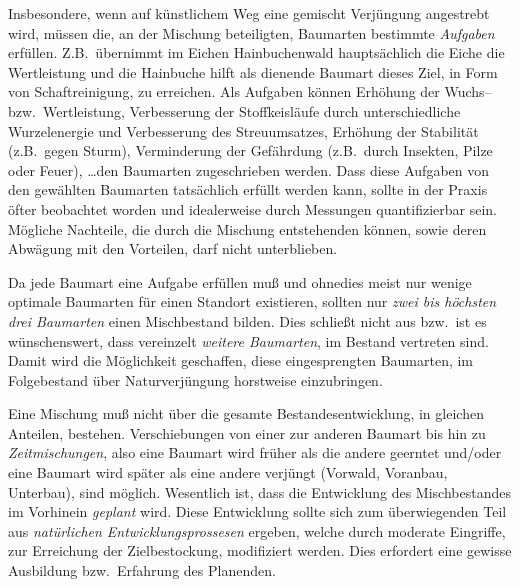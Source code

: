 \documentclass[twocolumn]{scrartcl}
\begin{document}
Insbesondere, wenn auf künstlichem Weg eine gemischt Verjüngung
angestrebt wird, müssen die, an der Mischung beteiligten, Baumarten
bestimmte \emph{Aufgaben} erfüllen. Z.B.\ übernimmt im Eichen
Hainbuchenwald hauptsächlich die Eiche die Wertleistung und die
Hainbuche hilft als dienende Baumart dieses Ziel, in Form von
Schaftreinigung, zu erreichen. Als Aufgaben können Erhöhung der
Wuchs-- bzw.\ Wertleistung, Verbesserung der Stoffkeisläufe durch
unterschiedliche Wurzelenergie und Verbesserung des Streuumsatzes,
Erhöhung der Stabilität (z.B.\ gegen Sturm), Verminderung der
Gefährdung (z.B.\ durch Insekten, Pilze oder Feuer), \dots den
Baumarten zugeschrieben werden. Dass diese Aufgaben von den gewählten
Baumarten tatsächlich erfüllt werden kann, sollte in der Praxis öfter
beobachtet worden und idealerweise durch Messungen quantifizierbar
sein. Mögliche Nachteile, die durch die Mischung entstehenden können,
sowie deren Abwägung mit den Vorteilen, darf nicht unterblieben.

Da jede Baumart eine Aufgabe erfüllen muß und ohnedies meist nur
wenige optimale Baumarten für einen Standort existieren, sollten nur
\emph{zwei bis höchsten drei Baumarten} einen Mischbestand
bilden. Dies schließt nicht aus bzw.\ ist es wünschenswert, dass
vereinzelt \emph{weitere Baumarten}, im Bestand vertreten sind. Damit
wird die Möglichkeit geschaffen, diese eingesprengten Baumarten, im
Folgebestand über Naturverjüngung horstweise einzubringen.

Eine Mischung muß nicht über die gesamte Bestandesentwicklung, in
gleichen Anteilen, bestehen. Verschiebungen von einer zur anderen
Baumart bis hin zu \emph{Zeitmischungen}, also eine Baumart wird
früher als die andere geerntet und/oder eine Baumart wird später als
eine andere verjüngt (Vorwald, Voranbau, Unterbau), sind
möglich. Wesentlich ist, dass die Entwicklung des Mischbestandes im
Vorhinein \emph{geplant} wird. Diese Entwicklung sollte sich zum
überwiegenden Teil aus \emph{natürlichen Entwicklungsprossesen}
ergeben, welche durch moderate Eingriffe, zur Erreichung der
Zielbestockung, modifiziert werden. Dies erfordert eine gewisse
Ausbildung bzw.\ Erfahrung des Planenden.
\end{document}
